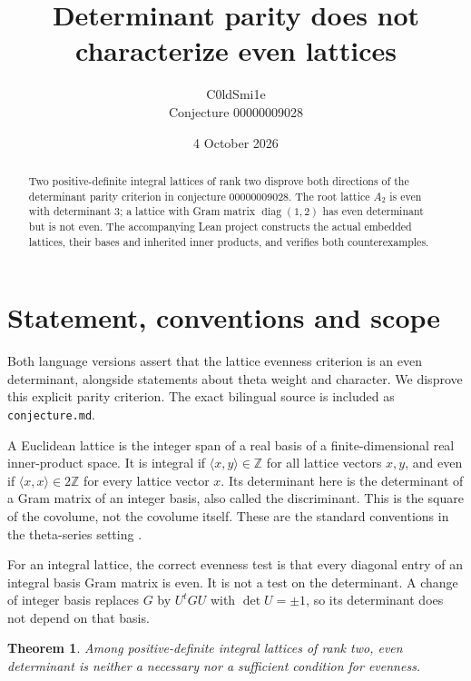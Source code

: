 \documentclass[10pt]{article}
\title{Determinant parity does not characterize even lattices}
\author{C0ldSmi1e\\\small Conjecture 00000009028}
\date{4 October 2026}
\newtheorem{theorem}{Theorem}
\newcommand{\Z}{\mathbb Z}
\begin{document}
\maketitle
\begin{abstract}
Two positive-definite integral lattices of rank two disprove both directions of the determinant parity criterion in conjecture 00000009028. The root lattice $A_2$ is even with determinant $3$; a lattice with Gram matrix $\operatorname{diag}(1,2)$ has even determinant but is not even. The accompanying Lean project constructs the actual embedded lattices, their bases and inherited inner products, and verifies both counterexamples.
\end{abstract}

\section{Statement, conventions and scope}
Both language versions assert that the lattice evenness criterion is an even determinant, alongside statements about theta weight and character. We disprove this explicit parity criterion. The exact bilingual source is included as \texttt{conjecture.md}.

A Euclidean lattice is the integer span of a real basis of a finite-dimensional real inner-product space. It is integral if $\langle x,y\rangle\in\Z$ for all lattice vectors $x,y$, and even if $\langle x,x\rangle\in2\Z$ for every lattice vector $x$. Its determinant here is the determinant of a Gram matrix of an integer basis, also called the discriminant. This is the square of the covolume, not the covolume itself. These are the standard conventions in the theta-series setting \cite{elkies,nebe}.

For an integral lattice, the correct evenness test is that every diagonal entry of an integral basis Gram matrix is even. It is not a test on the determinant. A change of integer basis replaces $G$ by $U^tGU$ with $\det U=\pm1$, so its determinant does not depend on that basis.

\begin{theorem}
Among positive-definite integral lattices of rank two, even determinant is neither a necessary nor a sufficient condition for evenness.
\end{theorem}
\end{document}
